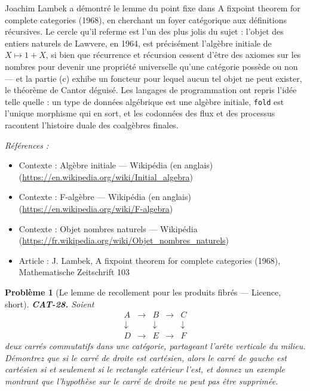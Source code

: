 \documentclass[11pt]{article}
\newtheorem{problem}{Problème}
\newenvironment{refs}{\par\small\noindent\emph{Références :}\begin{itemize}\setlength\itemsep{0pt}}{\end{itemize}\normalsize}
\begin{document}
\noindent Joachim Lambek a démontré le lemme du point fixe dans \og{} A fixpoint theorem for
complete categories \fg{} (1968), en cherchant un foyer catégorique aux définitions récursives. Le
cercle qu'il referme est l'un des plus jolis du sujet : l'objet des entiers naturels de Lawvere,
en 1964, est précisément l'algèbre initiale de $ X \mapsto 1 + X $, si bien que récurrence et
récursion cessent d'être des axiomes sur les nombres pour devenir une propriété universelle qu'une
catégorie possède ou non --- et la partie (c) exhibe un foncteur pour lequel aucun tel objet ne peut
exister, le théorème de Cantor déguisé. Les langages de programmation ont repris l'idée telle
quelle : un type de données algébrique est une algèbre initiale, \texttt{fold} est l'unique
morphisme qui en sort, et les codonnées des flux et des processus racontent l'histoire duale des
coalgèbres finales.

\begin{refs}
\item Contexte : Algèbre initiale --- Wikipédia (en anglais) (\url{https://en.wikipedia.org/wiki/Initial_algebra})
\item Contexte : F-algèbre --- Wikipédia (en anglais) (\url{https://en.wikipedia.org/wiki/F-algebra})
\item Contexte : Objet nombres naturels --- Wikipédia (\url{https://fr.wikipedia.org/wiki/Objet_nombres_naturels})
\item Article : J. Lambek, \og{} A fixpoint theorem for complete categories \fg{} (1968), Mathematische Zeitschrift 103
\end{refs}

\bigskip

\begin{problem}[{Le lemme de recollement pour les produits fibrés --- Licence, short}]
\textbf{CAT-28.} Soient
\[ \begin{array}{ccccc}
A & \longrightarrow & B & \longrightarrow & C \\
\downarrow & & \downarrow & & \downarrow \\
D & \longrightarrow & E & \longrightarrow & F
\end{array} \]
deux carrés commutatifs dans une catégorie, partageant l'arête verticale du milieu. Démontrez que
si le carré de droite est cartésien, alors le carré de gauche est cartésien si et seulement si le
rectangle extérieur l'est, et donnez un exemple montrant que l'hypothèse sur le carré de droite ne
peut pas être supprimée.
\end{problem}
\end{document}
